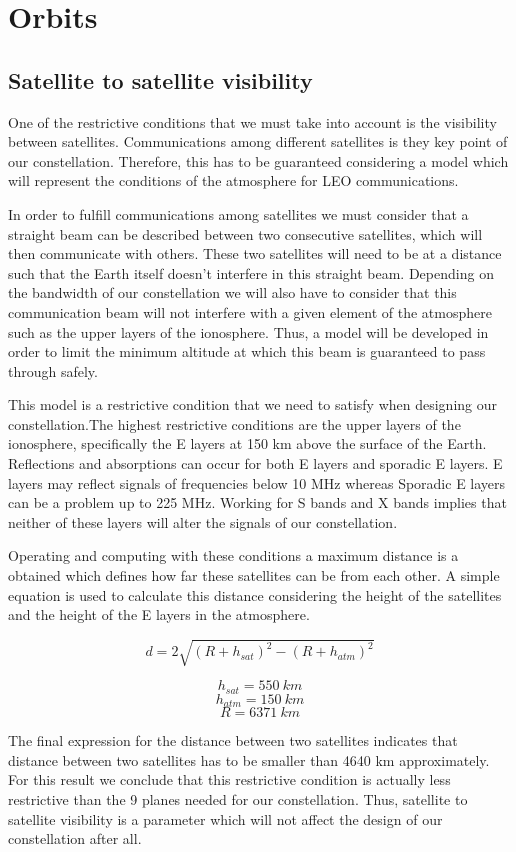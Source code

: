 \section{Orbits}

\subsection{Satellite to satellite visibility}
One of the restrictive conditions that we must take into account is the visibility between satellites. Communications among different satellites is they key point of our constellation. Therefore, this has to be guaranteed considering a model which will represent the conditions of the atmosphere for LEO communications.

In order to fulfill communications among satellites we must consider that a straight beam can be described between two consecutive satellites, which will then communicate with others. These two satellites will need to be at a distance such that the Earth itself doesn't interfere in this straight beam. Depending on the bandwidth of our constellation we will also have to consider that this communication beam will not interfere with a given element of the atmosphere such as the upper layers of the ionosphere. Thus, a model will be developed in order to limit the minimum altitude at which this beam is guaranteed to pass through safely.

This model is a restrictive condition that we need to satisfy when designing our constellation.The highest restrictive conditions are the upper layers of the ionosphere, specifically the E layers at 150 km above the surface of the Earth. Reflections and absorptions can occur for both E layers and sporadic E layers. E layers may reflect signals of frequencies below 10 MHz whereas Sporadic E layers can be a problem up to 225 MHz. Working for S bands and X bands implies that neither of these layers will alter the signals of our constellation.

Operating and computing with these conditions a maximum distance is a obtained which defines how far these satellites can be from each other. A simple equation is used to calculate this distance considering the height of the satellites and the height of the E layers in the atmosphere.

\[ d = 2 \sqrt{(R+h_{sat})^2 - (R+h_{atm})^2} \]

\[ h_{sat} = 550\ km\] 
\[ h_{atm} = 150\ km\]
\[R = 6371\ km\]

The final expression for the distance between two satellites indicates that distance between two satellites has to be smaller than 4640 km approximately. For this result we conclude that this restrictive condition is actually less restrictive than the 9 planes needed for our constellation. Thus, satellite to satellite visibility is a parameter which will not affect the design of our constellation after all. 